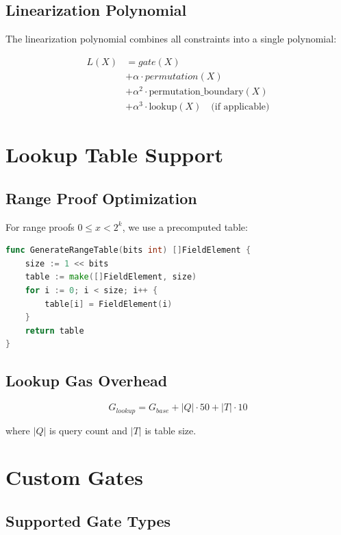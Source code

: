 \documentclass[11pt,a4paper]{article}
\theoremstyle{definition}
\begin{document}
\subsection{Linearization Polynomial}

The linearization polynomial combines all constraints into a single polynomial:

\begin{align}
L(X) &= gate(X) \\
&+ \alpha \cdot permutation(X) \\
&+ \alpha^2 \cdot \text{permutation\_boundary}(X) \\
&+ \alpha^3 \cdot \text{lookup}(X) \quad \text{(if applicable)}
\end{align}

\section{Lookup Table Support}

\subsection{Range Proof Optimization}

For range proofs $0 \leq x < 2^k$, we use a precomputed table:

\begin{lstlisting}[language=Go, caption={Range Table Generation}]
func GenerateRangeTable(bits int) []FieldElement {
    size := 1 << bits
    table := make([]FieldElement, size)
    for i := 0; i < size; i++ {
        table[i] = FieldElement(i)
    }
    return table
}
\end{lstlisting}

\subsection{Lookup Gas Overhead}

\begin{equation}
G_{lookup} = G_{base} + |Q| \cdot 50 + |T| \cdot 10
\end{equation}

where $|Q|$ is query count and $|T|$ is table size.

\section{Custom Gates}

\subsection{Supported Gate Types}
\end{document}
